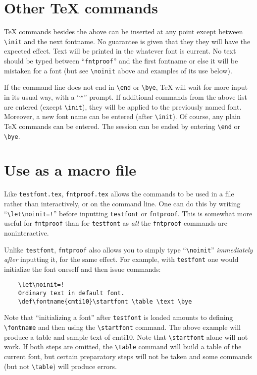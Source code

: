 \documentclass[draft]{article}
\newcommand\file[1]{\texttt{#1}}
\renewcommand\"{\verb"}
\begin{document}
{\begin{itemize}
\end{itemize}


\section{Other \TeX{} commands}

\TeX{} commands besides the above can be inserted at any point except
between \"\init" and the next fontname. No guarantee is given that they
they will have the expected effect. Text will be printed in the whatever 
font is current. No text should be typed between ``\file{fntproof}'' and 
the first fontname or else it will be mistaken for a font (but see 
\"\noinit" above and examples of its use below).

If the command line does not end in \"\end" or \"\bye", \TeX{} will wait
for more input in its usual way, with a ``\texttt{*}'' prompt. If additional
commands from the above list are entered (except \"\init"), they will be
applied to the previously named font. Moreover, a new font name can be
entered (after \"\init"). Of course, any plain \TeX{} commands can be
entered. The session can be ended by entering \"\end" or \"\bye".


\section{Use as a macro file}

Like \file{testfont.tex}, \file{fntproof.tex} allows the commands to be
used in a file rather than interactively, or on the command line. One
can do this by writing ``\"\let\noinit=!"'' before inputting
\file{testfont} or \file{fntproof}. This is somewhat more useful for
\file{fntproof} than for \file{testfont} as \emph{all} the \file{fntproof}
commands are noninteractive.

Unlike \file{testfont}, \file{fntproof} also allows you to simply type
``\"\noinit"'' \emph{immediately after} inputting it, for the same
effect. For example, with \file{testfont} one would initialize the font
oneself and then issue commands:
\begin{verbatim}
    \let\noinit=! 
    Ordinary text in default font.
    \def\fontname{cmti10}\startfont \table \text \bye
\end{verbatim}
Note that ``initializing a font'' after \file{testfont} is loaded 
amounts to defining \"\fontname" and then using the \"\startfont" 
command. The above example will produce a table and sample text of 
cmti10. Note that  \"\startfont" alone will not work.  If both steps are 
omitted, the \"\table" command will build a table of the current font, 
but certain preparatory steps will not be taken and some commands (but 
not \"\table") will produce errors.

}
\end{document}
